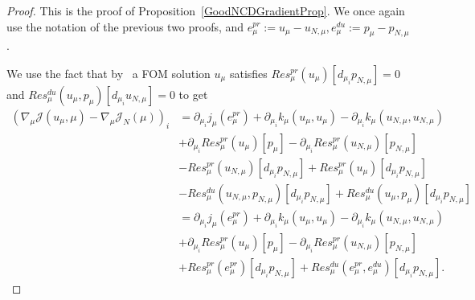 \begin{proof}
    This is the proof of Proposition~\ref{GoodNCDGradientProp}.
    We once again use the notation of the previous two proofs, and $e_\mu^{pr} := u_\mu - u_{N, \mu}, e_\mu^{du} := p_\mu - p_{N, \mu}$.

    We use the fact that by~\cite[Equations 3.1 and 3.2]{Keil2021} a FOM solution $u_\mu$ satisfies $Res_\mu^{pr}(u_\mu)[d_{\mu_i} p_{N, \mu}] = 0$ and $Res_\mu^{du}(u_\mu, p_\mu)[d_{\mu_i} u_{N, \mu}] = 0$ to get
    \begin{align}
        {\left( \nabla_\mu \mathcal{J}(u_\mu, \mu) - \nabla_\mu \mathcal{J}_N(\mu) \right)}_i &= \partial_{\mu_i} j_\mu(e_\mu^{pr}) + \partial_{\mu_i} k_\mu(u_\mu, u_\mu) - \partial_{\mu_i} k_\mu(u_{N, \mu}, u_{N, \mu}) \label{PrfEq5}\\
        &+ \partial_{\mu_i} Res_\mu^{pr}(u_\mu)[p_\mu] - \partial_{\mu_i} Res_\mu^{pr}(u_{N, \mu})[p_{N, \mu}] \nonumber\\
        &- Res_\mu^{pr}(u_{N, \mu})[d_{\mu_i} p_{N, \mu}] + Res_\mu^{pr}(u_\mu)[d_{\mu_i} p_{N, \mu}] \nonumber\\
        &- Res_\mu^{du}(u_{N, \mu}, p_{N, \mu})[d_{\mu_i} p_{N, \mu}] + Res_\mu^{du}(u_\mu, p_\mu)[d_{\mu_i} p_{N, \mu}] \nonumber\\
        &= \partial_{\mu_i} j_\mu(e_\mu^{pr}) + \partial_{\mu_i} k_\mu(u_\mu, u_\mu) - \partial_{\mu_i} k_\mu(u_{N, \mu}, u_{N, \mu}) \nonumber\\
        &+ \partial_{\mu_i} Res_\mu^{pr}(u_\mu)[p_\mu] - \partial_{\mu_i} Res_\mu^{pr}(u_{N, \mu})[p_{N, \mu}] \nonumber\\
        &+ Res_\mu^{pr}(e_\mu^{pr})[d_{\mu_i} p_{N, \mu}] + Res_\mu^{du}(e_\mu^{pr}, e_\mu^{du})[d_{\mu_i} p_{N, \mu}]. \nonumber
    \end{align}
\end{proof}